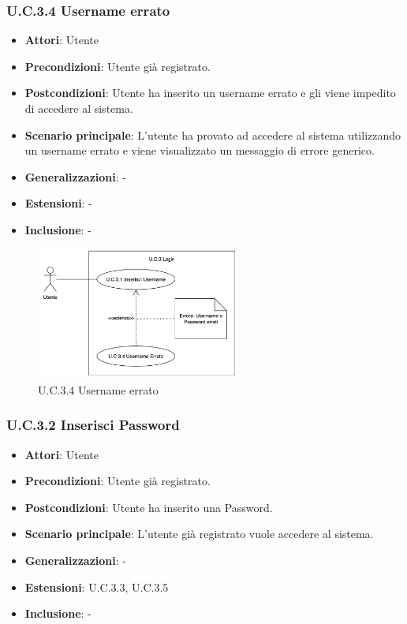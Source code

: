 \subsubsection{U.C.3.4 Username errato}
\begin{itemize}
    \item \textbf{Attori}: Utente
    \item \textbf{Precondizioni}: Utente già registrato.
    \item \textbf{Postcondizioni}: Utente ha inserito un username errato e gli viene impedito di accedere al sistema.
    \item \textbf{Scenario principale}: L’utente ha provato ad accedere al sistema utilizzando un username errato e viene visualizzato un messaggio di errore generico.
    \item \textbf{Generalizzazioni}: -
    \item \textbf{Estensioni}: -
    \item \textbf{Inclusione}: -
\end{itemize}
\begin{figure}[h!]
    \centering
    \includegraphics[width=0.6\textwidth]{img/UC3-4.png}
    \caption{U.C.3.4 Username errato}
\end{figure}
\subsubsection{U.C.3.2 Inserisci Password}
\begin{itemize}
    \item \textbf{Attori}: Utente
    \item \textbf{Precondizioni}: Utente già registrato.
    \item \textbf{Postcondizioni}: Utente ha inserito una Password.
    \item \textbf{Scenario principale}: L'utente già registrato vuole accedere al sistema.
    \item \textbf{Generalizzazioni}: -
    \item \textbf{Estensioni}: U.C.3.3, U.C.3.5
    \item \textbf{Inclusione}: -
\end{itemize}
